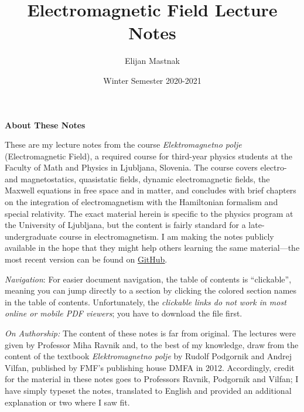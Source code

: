 \documentclass[11pt, a4paper]{article}
\begin{document}
\title{Electromagnetic Field Lecture Notes}
\author{Elijan Mastnak}
\date{Winter Semester 2020-2021}
\maketitle

\thispagestyle{empty}  %

\begin{center}
    \textbf{About These Notes}
\end{center}

These are my lecture notes from the course \textit{Elektromagnetno polje} (Electromagnetic Field), a required course for third-year physics students at the Faculty of Math and Physics in Ljubljana, Slovenia. The course covers electro- and magnetostatics, quasistatic fields, dynamic electromagnetic fields, the Maxwell equations in free space and in matter, and concludes with brief chapters on the integration of electromagnetism with the Hamiltonian formalism and special relativity. The exact material herein is specific to the physics program at the University of Ljubljana, but the content is fairly standard for a late-undergraduate course in electromagnetism. I am making the notes publicly available in the hope that they might help others learning the same material---the most recent version can be found on \href{https://github.com/ejmastnak/fmf/tree/main/electromagnetic-field}{\underline{GitHub}}.

\vspace{2mm}
\textit{Navigation}: For easier document navigation, the table of contents is ``clickable'', meaning you can jump directly to a section by clicking the colored section names in the table of contents. Unfortunately, the \textit{clickable links do not work in most online or mobile PDF viewers}; you have to download the file first.

\vspace{2mm}
\textit{On Authorship:} The content of these notes is far from original. The lectures were given by Professor Miha Ravnik and, to the best of my knowledge, draw from the content of the textbook \textit{Elektromagnetno polje} by Rudolf Podgornik and Andrej Vilfan, published by FMF's publishing house DMFA in 2012. Accordingly, credit for the material in these notes goes to Professors Ravnik, Podgornik and Vilfan; I have simply typeset the notes, translated to English and provided an additional explanation or two where I saw fit.
\end{document}
